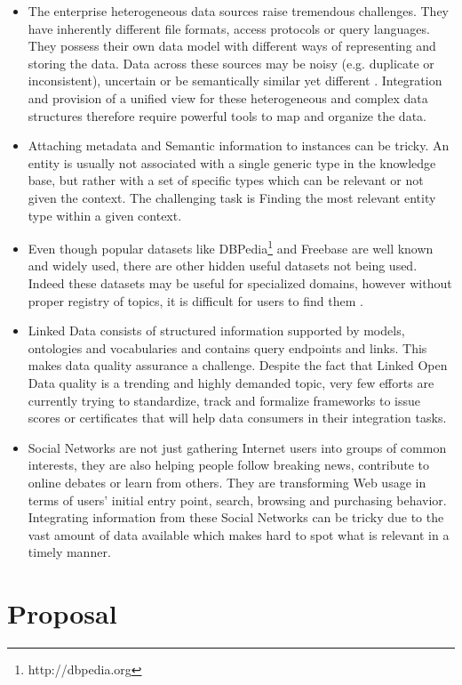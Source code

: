\documentclass[onecolumn, crcready]{iosart2c}
\begin{document}
\begin{itemize}
\item The enterprise heterogeneous data sources raise tremendous challenges. They have inherently different file formats, access protocols or query languages. They possess their own data model with different ways of representing and storing the data. Data across these sources may be noisy (e.g. duplicate or inconsistent), uncertain or be semantically similar yet different \cite{OntologyBasedSemantic}. Integration and provision of a unified view for these heterogeneous and complex data structures therefore require powerful tools to map and organize the data.
\item Attaching metadata and Semantic information to instances can be tricky. An entity is usually not associated with a single generic type in the knowledge base, but rather with a set of specific types which can be relevant or not given the context. The challenging task is Finding the most relevant entity type within a given context.
\item Even though popular datasets like DBPedia\footnote{http://dbpedia.org} and Freebase are well known and widely used, there are other hidden useful datasets not being used. Indeed these datasets may be useful for specialized domains, however without proper registry of topics, it is difficult for users to find them \cite{AutomaticDomainIdentification}.
\item Linked Data consists of structured information supported by models, ontologies and vocabularies and contains query endpoints and links. This makes data quality assurance a challenge. Despite the fact that Linked Open Data quality is a trending and highly demanded topic, very few efforts are currently trying to standardize, track and formalize frameworks to issue scores or certificates that will help data consumers in their integration tasks.
\item Social Networks are not just gathering Internet users into groups of common interests, they are also helping people follow breaking news, contribute to online debates or learn from others. They are transforming Web usage in terms of users' initial entry point, search, browsing and purchasing behavior. Integrating information from these Social Networks can be tricky due to the vast amount of data available which makes hard to spot what is relevant in a timely manner.
\end{itemize}

\section{Proposal}
\end{document}
